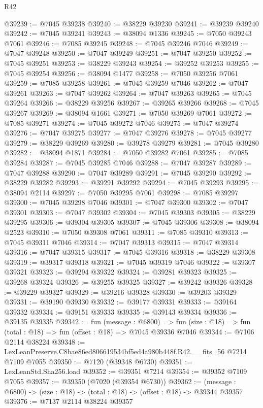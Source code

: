 \begin{lexlean}{R42}
\begin{coremodule}
{@39239 := @7045 @39238
@39240 := @38229 @39230
@39241 := @39239 @39240
@39242 := @7045 @39241
@39243 := @38094 @1336
@39245 := @7050 @39243 @7061
@39246 := @7085 @39245
@39248 := @7045 @39246 @7046
@39249 := @7047 @39248
@39250 := @7047 @39249
@39251 := @7047 @39250
@39252 := @7045 @39251
@39253 := @38229 @39243
@39254 := @39252 @39253
@39255 := @7045 @39254
@39256 := @38094 @1477
@39258 := @7050 @39256 @7061
@39259 := @7085 @39258
@39261 := @7045 @39259 @7046
@39262 := @7047 @39261
@39263 := @7047 @39262
@39264 := @7047 @39263
@39265 := @7045 @39264
@39266 := @38229 @39256
@39267 := @39265 @39266
@39268 := @7045 @39267
@39269 := @38094 @1661
@39271 := @7050 @39269 @7061
@39272 := @7085 @39271
@39274 := @7045 @39272 @7046
@39275 := @7047 @39274
@39276 := @7047 @39275
@39277 := @7047 @39276
@39278 := @7045 @39277
@39279 := @38229 @39269
@39280 := @39278 @39279
@39281 := @7045 @39280
@39282 := @38094 @1871
@39284 := @7050 @39282 @7061
@39285 := @7085 @39284
@39287 := @7045 @39285 @7046
@39288 := @7047 @39287
@39289 := @7047 @39288
@39290 := @7047 @39289
@39291 := @7045 @39290
@39292 := @38229 @39282
@39293 := @39291 @39292
@39294 := @7045 @39293
@39295 := @38094 @2114
@39297 := @7050 @39295 @7061
@39298 := @7085 @39297
@39300 := @7045 @39298 @7046
@39301 := @7047 @39300
@39302 := @7047 @39301
@39303 := @7047 @39302
@39304 := @7045 @39303
@39305 := @38229 @39295
@39306 := @39304 @39305
@39307 := @7045 @39306
@39308 := @38094 @2523
@39310 := @7050 @39308 @7061
@39311 := @7085 @39310
@39313 := @7045 @39311 @7046
@39314 := @7047 @39313
@39315 := @7047 @39314
@39316 := @7047 @39315
@39317 := @7045 @39316
@39318 := @38229 @39308
@39319 := @39317 @39318
@39321 := @7045 @39319 @7046
@39322 := @39307 @39321
@39323 := @39294 @39322
@39324 := @39281 @39323
@39325 := @39268 @39324
@39326 := @39255 @39325
@39327 := @39242 @39326
@39328 := @39229 @39327
@39329 := @39216 @39328
@39330 := @39203 @39329
@39331 := @39190 @39330
@39332 := @39177 @39331
@39333 := @39164 @39332
@39334 := @39151 @39333
@39335 := @39143 @39334
@39336 := @39135 @39335
@39342 := fun (message : @6800) =>
  fun (size : @18) => fun (total : @18) => fun (offset : @18) => @7045 @39336 @7046
@39344 := @7106 @2114 @38224
@39348 := LexLeanPreserve.C8bae86ed806619534bf5ed4a980b448f.R42.__fits_56 @7214 @7109 @7055
@39350 := @7120 (@39348 @6730)
@39351 := LexLeanStd.Sha256.load
@39352 := @39351 @7214
@39354 := @39352 @7109 @7055
@39357 := @39350 (@7020 (@39354 @6730))
@39362 := (message : @6800) -> (size : @18) -> (total : @18) -> (offset : @18) -> @39344 @39357
@39376 := @7137
    @2114
    @38224
    @39357
}
\end{coremodule}
\end{lexlean}
